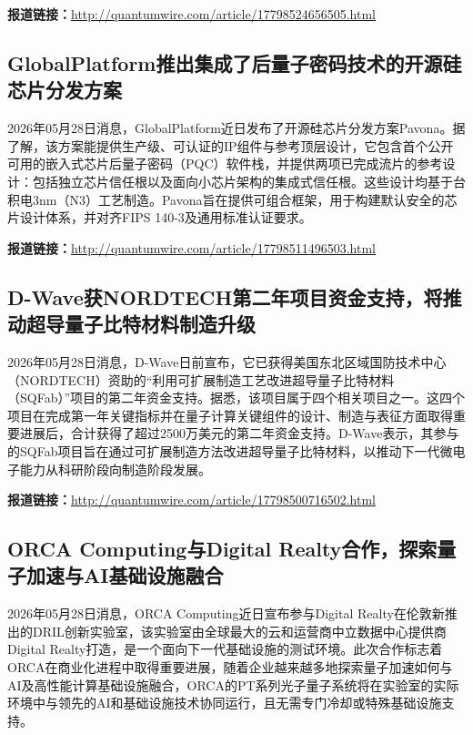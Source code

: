 \documentclass[12pt,a4paper]{ctexart}
\begin{document}
\noindent\textbf{报道链接：}\url{http://quantumwire.com/article/17798524656505.html}

\subsection{ GlobalPlatform推出集成了后量子密码技术的开源硅芯片分发方案 }

2026年05月28日消息，GlobalPlatform近日发布了开源硅芯片分发方案Pavona。据了解，该方案能提供生产级、可认证的IP组件与参考顶层设计，它包含首个公开可用的嵌入式芯片后量子密码（PQC）软件栈，并提供两项已完成流片的参考设计：包括独立芯片信任根以及面向小芯片架构的集成式信任根。这些设计均基于台积电3nm（N3）工艺制造。Pavona旨在提供可组合框架，用于构建默认安全的芯片设计体系，并对齐FIPS 140-3及通用标准认证要求。

\noindent\textbf{报道链接：}\url{http://quantumwire.com/article/17798511496503.html}

\subsection{ D-Wave获NORDTECH第二年项目资金支持，将推动超导量子比特材料制造升级 }

2026年05月28日消息，D-Wave日前宣布，它已获得美国东北区域国防技术中心（NORDTECH）资助的“利用可扩展制造工艺改进超导量子比特材料（SQFab）”项目的第二年资金支持。据悉，该项目属于四个相关项目之一。这四个项目在完成第一年关键指标并在量子计算关键组件的设计、制造与表征方面取得重要进展后，合计获得了超过2500万美元的第二年资金支持。D-Wave表示，其参与的SQFab项目旨在通过可扩展制造方法改进超导量子比特材料，以推动下一代微电子能力从科研阶段向制造阶段发展。

\noindent\textbf{报道链接：}\url{http://quantumwire.com/article/17798500716502.html}

\subsection{ ORCA Computing与Digital Realty合作，探索量子加速与AI基础设施融合 }

2026年05月28日消息，ORCA Computing近日宣布参与Digital Realty在伦敦新推出的DRIL创新实验室，该实验室由全球最大的云和运营商中立数据中心提供商Digital Realty打造，是一个面向下一代基础设施的测试环境。此次合作标志着ORCA在商业化进程中取得重要进展，随着企业越来越多地探索量子加速如何与AI及高性能计算基础设施融合，ORCA的PT系列光子量子系统将在实验室的实际环境中与领先的AI和基础设施技术协同运行，且无需专门冷却或特殊基础设施支持。
\end{document}
